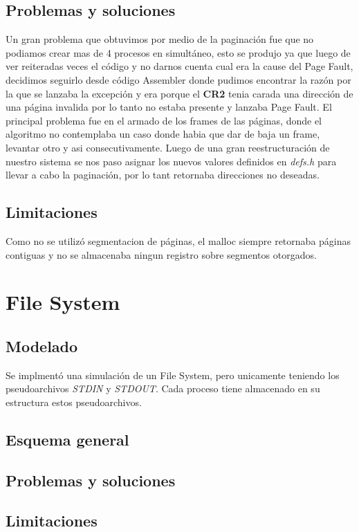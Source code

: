 \documentclass[10pt,a4paper]{article}
\begin{document}
	\subsection{Problemas y soluciones}
		Un gran problema que obtuvimos por medio de la paginaci\'on fue que no podiamos crear mas de 4 procesos en simult\'aneo, esto se produjo ya que luego de ver reiteradas veces el c\'odigo y no darnos cuenta cual era la cause del Page Fault, decidimos seguirlo desde c\'odigo Assembler donde pudimos encontrar la raz\'on por la que se lanzaba la excepci\'on y era porque el \textbf{CR2} tenia carada una direcci\'on de una p\'agina invalida por lo tanto no estaba presente y lanzaba Page Fault. El principal problema fue en el armado de los frames de las p\'aginas, donde el algoritmo no contemplaba un caso donde habia que dar de baja un frame, levantar otro y asi consecutivamente. Luego de una gran reestructuraci\'on de nuestro sistema se nos paso asignar los nuevos valores definidos en \textit{defs.h} para llevar a cabo la paginaci\'on, por lo tant retornaba direcciones no deseadas.
	\subsection{Limitaciones}
		Como no se utiliz\'o segmentacion de p\'aginas, el malloc siempre retornaba p\'aginas contiguas y no se almacenaba ningun registro sobre segmentos otorgados.

\section{File System} 
	\subsection{Modelado}
		Se implment\'o una simulaci\'on de un File System, pero unicamente teniendo los pseudoarchivos \textit{STDIN} y \textit{STDOUT}. Cada proceso tiene almacenado en su estructura estos pseudoarchivos.
	\subsection{Esquema general}
	\subsection{Problemas y soluciones}
	\subsection{Limitaciones}
\end{document}
